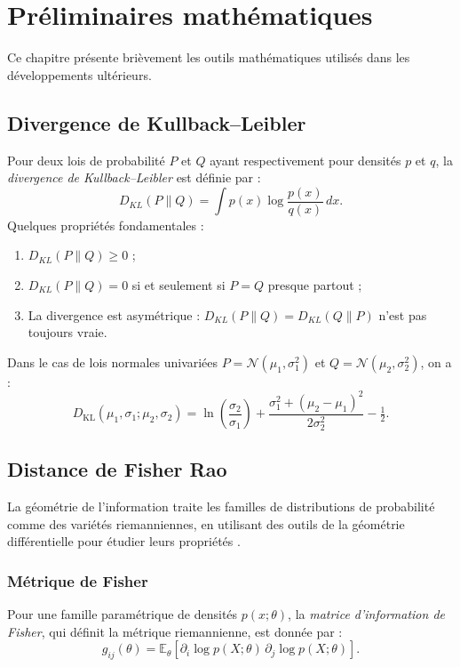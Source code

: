 \chapter{Préliminaires mathématiques}
\label{chap:math}
Ce chapitre présente brièvement les outils mathématiques utilisés dans les développements ultérieurs.

\section{Divergence de Kullback–Leibler}
Pour deux lois de probabilité $P$ et $Q$ ayant respectivement pour densités $p$ et $q$, la \emph{divergence de Kullback–Leibler} est définie par \citep{ay2017information} :
\begin{equation}
	D_{KL}(P\|Q) = \int p(x)\log\frac{p(x)}{q(x)}\,dx.
\end{equation}
Quelques propriétés fondamentales :
\begin{enumerate}
	\item $D_{KL}(P\|Q) \ge 0$ ;
	\item $D_{KL}(P\|Q) = 0$ si et seulement si $P = Q$ presque partout ;
	\item La divergence est asymétrique : $D_{KL}(P\|Q) = D_{KL}(Q\|P)$ n'est pas toujours vraie.
\end{enumerate}
Dans le cas de lois normales univariées $P = \mathcal{N}(\mu_1, \sigma_1^2)$ et $Q = \mathcal{N}(\mu_2, \sigma_2^2)$, on a \citep{belov2011distributions} :
\begin{equation}
	D_{\mathrm{KL}}(\mu_{1},\sigma_{1};\mu_{2},\sigma_{2})
	= \ln\left(\frac{\sigma_{2}}{\sigma_{1}}\right)
	+ \frac{\sigma_{1}^{2}+(\mu_{2}-\mu_{1})^{2}}{2\sigma_{2}^{2}} - \tfrac{1}{2}.
	\label{eq:kl_normal}
\end{equation}

\section{Distance de Fisher Rao}
La géométrie de l'information traite les familles de distributions de probabilité comme des variétés riemanniennes, en utilisant des outils de la géométrie différentielle pour étudier leurs propriétés \citep{ay2017information}.

\subsection{Métrique de Fisher}
Pour une famille paramétrique de densités $p(x;\theta)$, la \emph{matrice d'information de Fisher}, qui définit la métrique riemannienne, est donnée par :
\begin{equation}
	g_{ij}(\theta) = \mathbb{E}_{\theta}\!\left[\partial_{i}\log p(X;\theta)\,\partial_{j}\log p(X;\theta)\right].
\end{equation}

